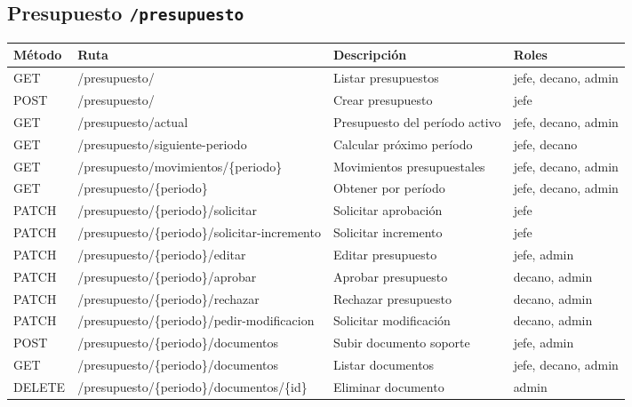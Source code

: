 \documentclass[12pt,a4paper]{article}
\begin{document}
\subsection{Presupuesto \texttt{/presupuesto}}
\begin{longtable}{>{\ttfamily}p{1.5cm} >{\ttfamily}p{6.5cm} p{3.5cm} p{2cm}}
  \toprule
  \textbf{Método} & \textbf{Ruta} & \textbf{Descripción} & \textbf{Roles} \\
  \midrule
  GET    & /presupuesto/ & Listar presupuestos & jefe, decano, admin \\
  POST   & /presupuesto/ & Crear presupuesto & jefe \\
  GET    & /presupuesto/actual & Presupuesto del período activo & jefe, decano, admin \\
  GET    & /presupuesto/siguiente-periodo & Calcular próximo período & jefe, decano \\
  GET    & /presupuesto/movimientos/\{periodo\} & Movimientos presupuestales & jefe, decano, admin \\
  GET    & /presupuesto/\{periodo\} & Obtener por período & jefe, decano, admin \\
  PATCH  & /presupuesto/\{periodo\}/solicitar & Solicitar aprobación & jefe \\
  PATCH  & /presupuesto/\{periodo\}/solicitar-incremento & Solicitar incremento & jefe \\
  PATCH  & /presupuesto/\{periodo\}/editar & Editar presupuesto & jefe, admin \\
  PATCH  & /presupuesto/\{periodo\}/aprobar & Aprobar presupuesto & decano, admin \\
  PATCH  & /presupuesto/\{periodo\}/rechazar & Rechazar presupuesto & decano, admin \\
  PATCH  & /presupuesto/\{periodo\}/pedir-modificacion & Solicitar modificación & decano, admin \\
  POST   & /presupuesto/\{periodo\}/documentos & Subir documento soporte & jefe, admin \\
  GET    & /presupuesto/\{periodo\}/documentos & Listar documentos & jefe, decano, admin \\
  DELETE & /presupuesto/\{periodo\}/documentos/\{id\} & Eliminar documento & admin \\
  \bottomrule
\end{longtable}

\end{document}
